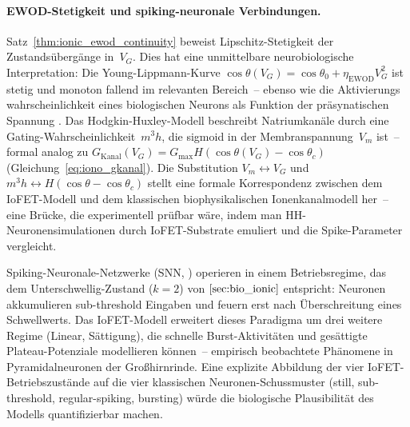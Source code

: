 ﻿\documentclass[12pt, a4paper, openany]{report}
\begin{document}
\paragraph{EWOD-Stetigkeit und spiking-neuronale Verbindungen.}
Satz~\ref{thm:ionic_ewod_continuity} beweist Lipschitz-Stetigkeit der
Zustandsübergänge in~$V_G$.  Dies hat eine unmittelbare neurobiologische
Interpretation: Die Young-Lippmann-Kurve
$\cos\theta(V_G) = \cos\theta_0 + \eta_{\text{EWOD}} V_G^2$ ist stetig
und monoton fallend im relevanten Bereich~-- ebenso wie die Aktivierungs\-
wahrscheinlichkeit eines biologischen Neurons als Funktion der präsynatischen
Spannung \cite{hodgkin52}.  Das Hodgkin-Huxley-Modell \cite{hodgkin52}
beschreibt Natriumkanäle durch eine Gating-Wahrscheinlichkeit~$m^3 h$, die
sigmoid in der Membranspannung~$V_m$ ist~-- formal analog zu
$G_{\text{Kanal}}(V_G) = G_{\max} H(\cos\theta(V_G) - \cos\theta_c)$
(Gleichung~\ref{eq:iono_gkanal}).  Die Substitution $V_m \leftrightarrow V_G$
und $m^3 h \leftrightarrow H(\cos\theta - \cos\theta_c)$ stellt eine
formale Korrespondenz zwischen dem IoFET-Modell und dem klassischen
biophysikalischen Ionenkanal\-modell her~-- eine Brücke, die experimentell
prüfbar wäre, indem man HH-Neuronensimulationen durch IoFET-Substrate
emuliert und die Spike-Parameter vergleicht.

Spiking-Neuronale-Netzwerke (SNN, \cite{maass97}) operieren in einem
Betriebsregime, das dem Unterschwellig-Zustand ($k=2$) von
$\cref{sec:bio_ionic}$ entspricht: Neuronen akkumulieren sub-threshold
Eingaben und feuern erst nach Überschreitung eines Schwellwerts.  Das
IoFET-Modell erweitert dieses Paradigma um drei weitere Regime (Linear,
Sättigung), die schnelle Burst-Aktivitäten und gesättigte Plateau-Potenziale
modellieren können~-- empirisch beobachtete Phänomene in Pyramidalneuronen
der Großhirnrinde.  Eine explizite Abbildung der vier IoFET-Betriebszustände
auf die vier klassischen Neuronen-Schussmuster (still, sub-threshold,
regular-spiking, bursting) würde die biologische Plausibilität des Modells
quantifizierbar machen.
\end{document}
